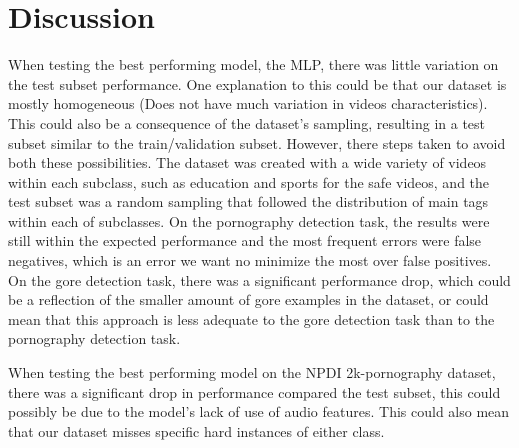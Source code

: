 \section{Discussion}\label{sec:discussion}
When testing the best performing model, the MLP, there was little variation on the test subset performance. One explanation to this could be that our dataset is mostly homogeneous (Does not have much variation in videos characteristics). This could also be a consequence of the dataset's sampling, resulting in a test subset similar to the train/validation subset.  However, there steps taken to avoid both these possibilities. The dataset was created with a wide variety of videos within each subclass, such as education and sports for the safe videos, and the test subset was a random sampling that followed the distribution of main tags within each of subclasses.
On the pornography detection task, the results were still within the expected performance and the most frequent errors were false negatives, which is an error we want no minimize the most over false positives.
On the gore detection task, there was a significant performance drop, which could be a reflection of the smaller amount of gore examples in the dataset, or could mean that this approach is less adequate to the gore detection task than to the pornography detection task.

When testing the best performing model on the NPDI 2k-pornography dataset, there was a significant drop in performance compared the test subset, this could possibly be due to the model's lack of use of audio features. This could also mean that our dataset misses specific hard instances of either class.



